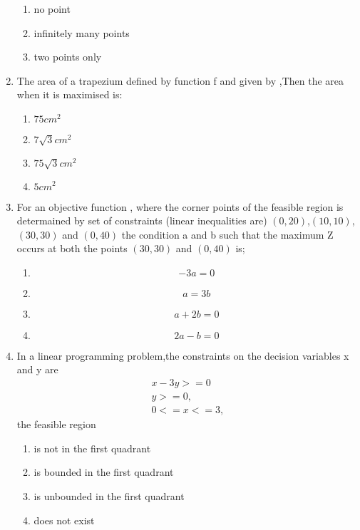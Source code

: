 \documentclass{article}
\begin{document}
\begin{enumerate}
\begin{enumerate}[label = (\Alph*)]
			\item no point
			\item infinitely many points
			\item two points only
		\end{enumerate}
	\item The area of a trapezium  defined by function f and given by ,Then the area when it is maximised is:
		\begin{enumerate}[label=(\Alph*)]
			\item $75cm^2$
			\item $7\sqrt{3}cm^2$
			\item $75\sqrt{3}cm^2$
			\item $5cm^2$
		\end{enumerate}
	\item For an objective function , where  the corner points of the feasible region is determained by set of constraints (linear inequalities are) $(0,20)$,$(10,10)$,$(30,30)$ and $(0,40)$ the condition a and b such that the maximum Z occurs at both the points $(30,30)$ and $(0,40)$ is;
		\begin{enumerate}[label=(\Alph*)]
			\item 
				$$-3a=0 $$
			\item 
				$$ a=3b $$
			\item 
				$$ a+2b=0 $$
			\item 
				$$ 2a-b=0 $$
		\end{enumerate}
	\item In a linear programming problem,the constraints on the decision variables x and y are 
		\begin{align}
		    x-3y>=0
		   \\ y>=0,
		   \\ 0<=x<=3,
		\end{align}
		the feasible region 
		\begin{enumerate}[label=(\Alph*)]
			\item is not in the first quadrant
			\item is bounded in the first quadrant
			\item is unbounded in the first quadrant
			\item does not exist
		\end{enumerate}
 \end{enumerate}
 
\end{document}
